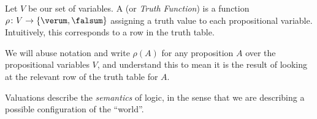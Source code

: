 \begin{node}\label{prop-0004}%
Let $V$ be our set of variables. A  (or
\textit{Truth Function}) is a function $\rho\colon V\to\{\verum,\falsum\}$
assigning a truth value to each propositional variable. Intuitively,
this corresponds to a row in the truth table.

We will abuse notation and write $\rho(A)$ for any proposition $A$ over
the propositional variables $V$, and understand this to mean it is the
result of looking at the relevant row of the truth table for $A$.

Valuations describe the \emph{semantics} of logic, in the sense
that we are describing a possible configuration of the ``world''.
\end{node}
